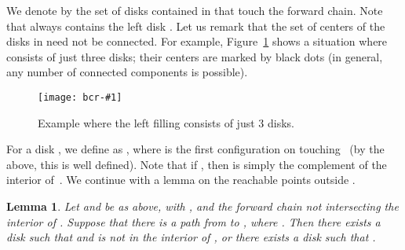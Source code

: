 \documentclass[a4paper]{article}
\newtheorem{lemma}[theorem]{Lemma}
\newcommand{\epsfigure}[2]{
  \begin{figure}[htb]
    \centerline{\texttt{[image: bcr-\#1]}}
    \caption{#2}
    \label{f:#1}
  \end{figure}}
\begin{document}
We denote by  the set of disks contained in  that touch the forward chain.  Note that 
always contains the left disk .  Let us remark that the
set of centers of the disks in  need not be connected.
For example, Figure~\ref{f:nonc} shows a situation where
 consists of just three disks; their centers are marked by
black dots (in general, any number of connected components is
possible).
\epsfigure{nonc}{Example where the left filling consists of just 3
  disks.} 
For a disk , we define  as
, where  is the first configuration on 
touching~ (by the above, this is well defined).  Note
that if , then  is simply the complement of the
interior of~.
We continue with a lemma on the reachable
points outside .
\begin{lemma}\label{l:tinDL}
  Let  and  be as above, with , and the forward chain  not intersecting the
  interior of .  
  Suppose that there is a path  from  to
  , where . Then there exists a disk
   such that  and  is not in the interior of , 
  or there
  exists a disk   such that .
\end{lemma}
\end{document}

